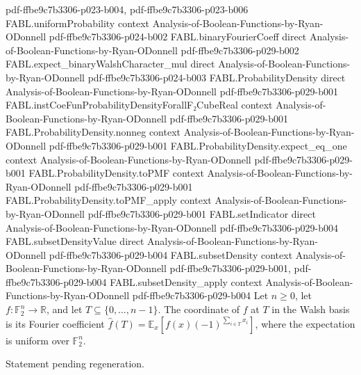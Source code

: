 \begin{theorem}
  {pdf-ffbe9c7b3306-p023-b004,
    pdf-ffbe9c7b3306-p023-b006}
\proofstep
  {FABL.uniformProbability}
  {context}
  {Analysis-of-Boolean-Functions-by-Ryan-ODonnell}
  {pdf-ffbe9c7b3306-p024-b002}
\proofstep
  {FABL.binaryFourierCoeff}
  {direct}
  {Analysis-of-Boolean-Functions-by-Ryan-ODonnell}
  {pdf-ffbe9c7b3306-p029-b002}
\proofstep
  {FABL.expect_binaryWalshCharacter_mul}
  {direct}
  {Analysis-of-Boolean-Functions-by-Ryan-ODonnell}
  {pdf-ffbe9c7b3306-p024-b003}
\proofstep
  {FABL.ProbabilityDensity}
  {direct}
  {Analysis-of-Boolean-Functions-by-Ryan-ODonnell}
  {pdf-ffbe9c7b3306-p029-b001}
\proofstep
  {FABL.instCoeFunProbabilityDensityForallF₂CubeReal}
  {context}
  {Analysis-of-Boolean-Functions-by-Ryan-ODonnell}
  {pdf-ffbe9c7b3306-p029-b001}
\proofstep
  {FABL.ProbabilityDensity.nonneg}
  {context}
  {Analysis-of-Boolean-Functions-by-Ryan-ODonnell}
  {pdf-ffbe9c7b3306-p029-b001}
\proofstep
  {FABL.ProbabilityDensity.expect_eq_one}
  {context}
  {Analysis-of-Boolean-Functions-by-Ryan-ODonnell}
  {pdf-ffbe9c7b3306-p029-b001}
\proofstep
  {FABL.ProbabilityDensity.toPMF}
  {context}
  {Analysis-of-Boolean-Functions-by-Ryan-ODonnell}
  {pdf-ffbe9c7b3306-p029-b001}
\proofstep
  {FABL.ProbabilityDensity.toPMF_apply}
  {context}
  {Analysis-of-Boolean-Functions-by-Ryan-ODonnell}
  {pdf-ffbe9c7b3306-p029-b001}
\proofstep
  {FABL.setIndicator}
  {direct}
  {Analysis-of-Boolean-Functions-by-Ryan-ODonnell}
  {pdf-ffbe9c7b3306-p029-b004}
\proofstep
  {FABL.subsetDensityValue}
  {direct}
  {Analysis-of-Boolean-Functions-by-Ryan-ODonnell}
  {pdf-ffbe9c7b3306-p029-b004}
\proofstep
  {FABL.subsetDensity}
  {context}
  {Analysis-of-Boolean-Functions-by-Ryan-ODonnell}
  {pdf-ffbe9c7b3306-p029-b001,
    pdf-ffbe9c7b3306-p029-b004}
\proofstep
  {FABL.subsetDensity_apply}
  {context}
  {Analysis-of-Boolean-Functions-by-Ryan-ODonnell}
  {pdf-ffbe9c7b3306-p029-b004}
Let $n\ge 0$, let $f:\mathbb F_2^n\to\mathbb R$, and let $T\subseteq\{0,\ldots,n-1\}$.
The coordinate of $f$ at $T$ in the Walsh basis is its Fourier coefficient $\widehat
f(T)=\mathbb E_x[f(x)(-1)^{\sum_{i\in T}x_i}]$, where the expectation is uniform over
$\mathbb F_2^n$.
\end{theorem}

\begin{theorem}
\label{FABL.binary_fourier_expansion}
\leanok
{}
Statement pending regeneration.
\end{theorem}

